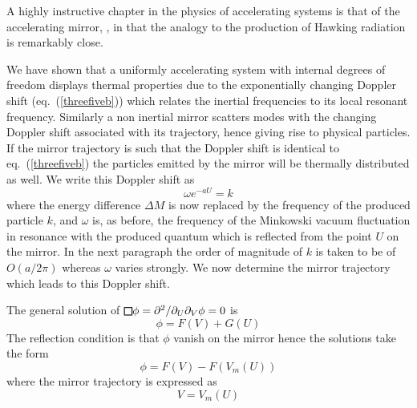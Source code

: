 \documentclass[12pt,oneside]{report}
\def\sqr#1#2{{\vcenter{\vbox{\hrule height.#2pt
          \hbox{\vrule width.#2pt height#1pt \kern#1pt
           \vrule width.#2pt}
           \hrule height.#2pt}}}}
\def\square{\mathchoice\sqr68\sqr68\sqr{4.2}6\sqr{3}6}
\begin{document}
A highly instructive chapter in the physics of accelerating
systems is that of the accelerating mirror\cite{FuDa}, \cite{DaFu}, \cite{BD} in
that the analogy to the production of Hawking radiation is remarkably close.

We have shown that a uniformly accelerating system with
 internal degrees of freedom displays thermal properties
due to the exponentially changing Doppler shift (eq.~(\ref{threefiveb})) which
relates the inertial frequencies to its local resonant frequency. Similarly a
non inertial mirror scatters  modes with the changing Doppler shift associated
with its trajectory, hence giving rise to physical
particles. If the mirror trajectory is such that the
Doppler shift is identical to eq.~(\ref{threefiveb}) the particles
emitted by the mirror will be thermally distributed as well.
We write this Doppler shift as
\begin{equation}
\omega e^{-aU} = k
\label{mirone}
\end{equation}
where the energy difference $\Delta M$ is now replaced by
the frequency of the produced particle $k$, and
$\omega$ is, as before, the frequency of the Minkowski
vacuum fluctuation in resonance with the produced quantum which is reflected
from the point $U$ on the mirror. In the next paragraph the order of magnitude of
$k$ is  taken to be of $O(a/ 2 \pi)$ whereas $\omega$ varies strongly. We now
determine the mirror trajectory which leads to this Doppler shift.

The general solution of $\square \phi = \partial^2 /
\partial_U\partial_V \phi =0$ is 
\begin{equation}
\phi = F(V) + G(U)
\label{mirtwo}
\end{equation}
The reflection condition is that $\phi$ vanish on the
mirror hence the solutions take the form
\begin{equation}
\phi = F(V) - F(V_m(U))
\label{mirthree}
\end{equation}
where the mirror trajectory is expressed as
\begin{equation}
V=V_m(U)
\label{mirfour}
\end{equation}
\end{document}
